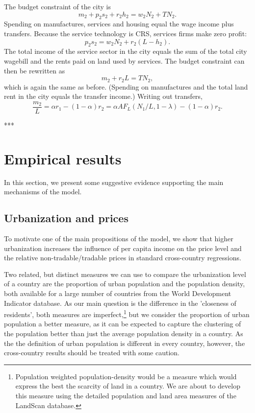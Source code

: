 \documentclass[12pt]{article}
\begin{document}
The budget constraint of the city is
\[
m_2 +p_2s_2+r_2h_2 = w_2N_2+TN_2.
\]
Spending on manufactures, services and housing equal the wage income plus transfers. Because the service technology is CRS, services firms make zero profit:
\[
p_2s_2 = w_2N_2+r_2(L-h_2).
\]
The total income of the service sector in the city equals the sum of the total city wagebill and the rents paid on land used by services. The budget constraint can then be rewritten as
\[
m_2 +r_2L = TN_2,
\]
which is again the same as before. (Spending on manufactures and the total land rent in the city equals the transfer income.) Writing out transfers,
\begin{equation}\label{eq:eq3b}
    \frac{m_2}{L} = \alpha r_1-(1-\alpha)r_2 = \alpha AF_L(N_1/L,1-{\lambda})-(1-\alpha)r_2.
\end{equation}

***


\section{Empirical results}
In this section, we present some suggestive evidence supporting the
main mechanisms of the model.

\subsection{Urbanization and prices}
To motivate one of the main propositions of the model, we show that
higher urbanization increases the influence of per capita income on
the price level and the relative non-tradable/tradable prices in
standard cross-country regressions.

Two related, but distinct measures we can use to compare the
urbanization level of a country are the proportion of urban
population and the population density, both available for a large
number of countries from the World Development Indicator database.
As our main question is the difference in the 'closeness of
residents', both measures are imperfect,\footnote{Population
weighted population-density would be a measure which would express
the best the scarcity of land in a country. We are about to develop
this measure using the detailed population and land area measures of
the LandScan database.} but we consider the proportion of urban
population a better measure, as it can be expected to capture the
clustering of the population better than just the average population
density in a country. As the the definition of urban population is
different in every country, however, the cross-country results
should be treated with some caution.
\end{document}
